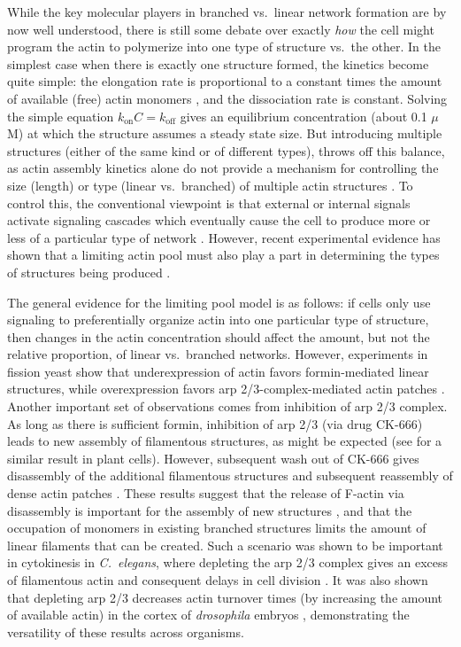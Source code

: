 \documentclass[11pt]{article}
\begin{document}
While the key molecular players in branched vs.\ linear network formation are by now well understood, there is still some debate over exactly \emph{how} the cell might program the actin to polymerize into one type of structure vs.\ the other. In the simplest case when there is exactly one structure formed, the kinetics become quite simple: the elongation rate is proportional to a constant times the amount of available (free) actin monomers \cite{suarez2016internetwork}, and the dissociation rate is constant. Solving the simple equation $k_\text{on} C=k_\text{off}$ gives an equilibrium concentration (about 0.1 $\mu$M) at which the structure assumes a steady state size. But introducing multiple structures (either of the same kind or of different types), throws off this balance, as actin assembly kinetics alone do not provide a mechanism for controlling the size (length) or type (linear vs.\ branched) of multiple actin structures \cite{mohapatra2017limiting}. To control this, the conventional viewpoint is that external or internal signals \cite{carlier2017global} activate signaling cascades which eventually cause the cell to produce more or less of a particular type of network \cite{martin2005tea4p, pollard2007regulation, suarez2016internetwork}. However, recent experimental evidence has shown that a limiting actin pool must also play a part in determining the types of structures being produced \cite{burke2014homeostatic}. 

The general evidence for the limiting pool model is as follows: if cells only use signaling to preferentially organize actin into one particular type of structure, then changes in the actin concentration should affect the amount, but not the relative proportion, of linear vs.\ branched networks. However, experiments in fission yeast show that underexpression of actin favors formin-mediated linear structures, while overexpression favors arp 2/3-complex-mediated actin patches \cite{burke2014homeostatic}. Another important set of observations comes from inhibition of arp 2/3 complex. As long as there is sufficient formin, inhibition of arp 2/3 (via drug CK-666) leads to new assembly of filamentous structures, as might be expected (see \cite{xu2023cooperative} for a similar result in plant cells). However, subsequent wash out of CK-666 gives disassembly of the additional filamentous structures and subsequent reassembly of dense actin patches \cite{burke2014homeostatic}. These results suggest that the release of F-actin via disassembly is important for the assembly of new structures \cite{suarez2016internetwork}, and that the occupation of monomers in existing branched structures limits the amount of linear filaments that can be created. Such a scenario was shown to be important in cytokinesis in \emph{C.\ elegans}, where depleting the arp 2/3 complex gives an excess of filamentous actin and consequent delays in cell division \cite{chan2019arp2}. It was also shown that depleting arp 2/3 decreases actin turnover times (by increasing the amount of available actin) in the cortex of \emph{drosophila} embryos \cite{xie2021combinatorial}, demonstrating the versatility of these results across organisms.
\end{document}
